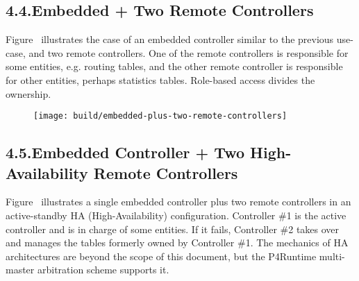 \documentclass[11pt]{article}
\begin{document}
{%
\subsection{4.4.\hspace*{0.5em}Embedded + Two Remote Controllers}\label{sec-embedded-two-remote-controllers}%

\noindent{}Figure~ illustrates the case of an
embedded controller similar to the previous use-case, and two remote
controllers. One of the remote controllers is responsible for some entities,
e.g. routing tables, and the other remote controller is responsible for other
entities, perhaps statistics tables. Role-based access divides the ownership.%

\begin{figure}[tbp]%
\begin{mdcenter}%

\noindent{}\texttt{[image: build/embedded-plus-two-remote-controllers]}{}%

\mdhr{}%

\noindent{}%
\end{mdcenter}\label{fig-embedded-plus-two-remote-controllers}%
\end{figure}%

\subsection{4.5.\hspace*{0.5em}Embedded Controller + Two High-Availability Remote Controllers}\label{sec-embedded-controller-two-high-availability-remote-controllers}%

\noindent{}Figure~ illustrates a single
embedded controller plus two remote controllers in an active-standby HA
(High-Availability) configuration. Controller \#1 is the active controller and is
in charge of some entities. If it fails, Controller \#2 takes over and manages
the tables formerly owned by Controller \#1. The mechanics of HA architectures
are beyond the scope of this document, but the P4Runtime multi-master
arbitration scheme supports it.%

}
\end{document}
